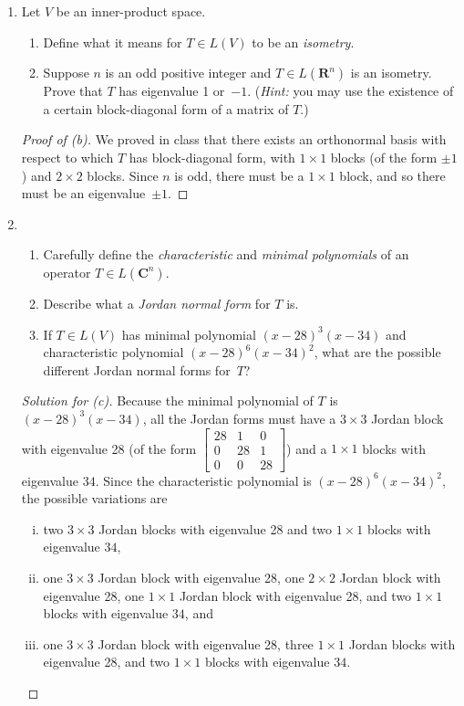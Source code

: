 \documentclass[12pt]{amsart}
\def\C{\mathbf{C}}
\def\R{\mathbf{R}}
\begin{document}
\begin{enumerate}
\newpage
\item Let $V$ be an inner-product space.
  \begin{enumerate} 
  \item Define what it means for $T \in L(V)$ to be an \emph{isometry}.
  \item Suppose $n$ is an odd positive integer and $T \in L(\R^n)$ is an isometry. Prove that $T$ has eigenvalue 1 or~$-1$. (\emph{Hint:} you may use the existence of a certain block-diagonal form of a matrix of $T$.)
  \end{enumerate}

\begin{proof}[Proof of {\rm (b)}]
We proved in class that there exists an orthonormal basis with respect to which $T$ has block-diagonal form, with $1 \times 1$ blocks (of the form $\pm 1$) and $2 \times 2$ blocks. Since $n$ is odd, there must be a $1 \times 1$ block, and so there must be an eigenvalue~$\pm 1$.
\end{proof}


\item
  \begin{enumerate} 
  \item Carefully define the \emph{characteristic} and \emph{minimal polynomials} of an operator $T \in L(\C^n)$.
  \item Describe what a \emph{Jordan normal form} for $T$ is.
  \item If $T \in L(V)$ has minimal polynomial $(x-28)^3 (x-34)$ and characteristic polynomial $(x-28)^6 (x-34)^2$, what are the possible different Jordan normal forms for~$T$?
  \end{enumerate}

\begin{proof}[Solution for {\rm (c)}]
Because the minimal polynomial of $T$ is $(x-28)^3 (x-34)$, all the Jordan forms must have a $3 \times 3$ Jordan block with eigenvalue 28 (of the form $\begin{bmatrix} 28&1&0\\ 0&28&1\\ 0&0&28 \end{bmatrix}$) and a $1 \times 1$ blocks with eigenvalue $34$. Since the characteristic polynomial is $(x-28)^6 (x-34)^2$, the possible variations are
\begin{enumerate}[(i)]
\item two $3 \times 3$ Jordan blocks with eigenvalue 28 and two $1 \times 1$ blocks with eigenvalue $34$,
\item one $3 \times 3$ Jordan block with eigenvalue 28, one $2 \times 2$ Jordan block with eigenvalue 28, one $1 \times 1$ Jordan block with eigenvalue 28, and two $1 \times 1$ blocks with eigenvalue $34$, and
\item one $3 \times 3$ Jordan block with eigenvalue 28, three $1 \times 1$ Jordan blocks with eigenvalue 28, and two $1 \times 1$ blocks with eigenvalue $34$. \qedhere
\end{enumerate}
\end{proof}



\end{enumerate}
\end{document}
